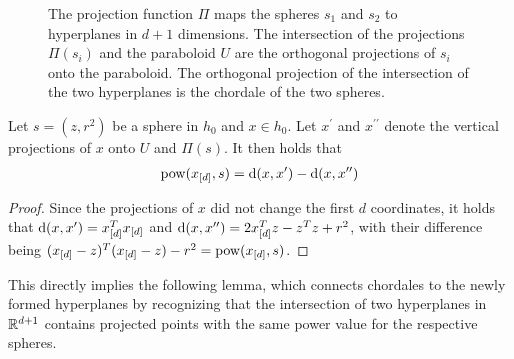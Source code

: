 \begin{figure}[tb]
    \caption{The projection function $\Pi$ maps the spheres $s_1$ and $s_2$ to hyperplanes in $d+1$ dimensions.
    The intersection of the projections $\Pi(s_i)$ and the paraboloid $U$ are the orthogonal projections of $s_i$ onto the paraboloid.
    The orthogonal projection of the intersection of the two hyperplanes is the chordale of the two spheres.}
    \label{fig:projection}
\end{figure}
\begin{observation}
    \label{obs:distances}
    Let $s = (z, r^2)$ be a sphere in $h_0$ and $x \in h_0$.
    Let $x^\prime$ and $x^{\prime\prime}$ denote the vertical projections of $x$ onto $U$ and $\Pi(s)$. It then holds that
    \begin{align}
        \operatorname{pow}(x_{[d]}, s) = \operatorname{d}(x, x^\prime) - \operatorname{d}(x, x^{\prime\prime})
    \end{align}
\end{observation}
\begin{proof}
    Since the projections of $x$ did not change the first $d$ coordinates, it holds that $\operatorname{d}(x, x^\prime) = x_{[d]}^Tx_{[d]}$ and $\operatorname{d}(x, x^{\prime\prime}) = 2x_{[d]}^Tz - z^Tz + r^2$, with their difference being $(x_{[d]} - z)^T(x_{[d]} - z) - r^2 = \operatorname{pow}(x_{[d]}, s)$.
\end{proof}

This directly implies the following lemma, which connects chordales to the newly formed hyperplanes by recognizing that the intersection of two hyperplanes in $\mathbb{R}^{d+1}$ contains projected points with the same power value for the respective spheres.


